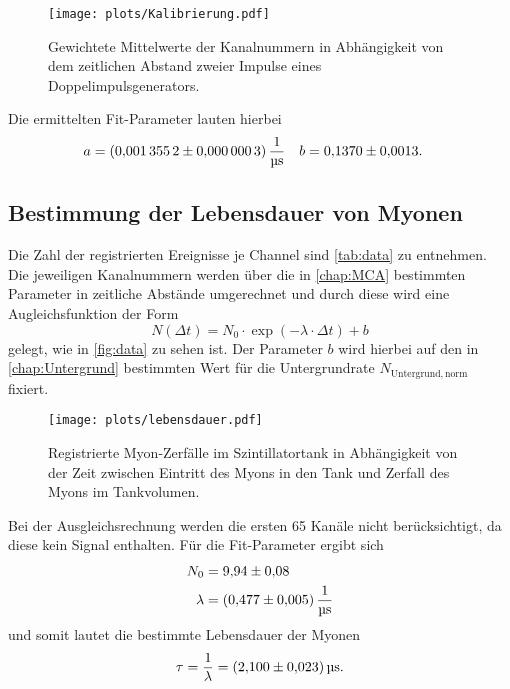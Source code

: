 \begin{figure}[H]
  \centering
  \texttt{[image: plots/Kalibrierung.pdf]}
  \caption{Gewichtete Mittelwerte der Kanalnummern in Abhängigkeit von dem zeitlichen Abstand zweier Impulse eines Doppelimpulsgenerators.}
  \label{fig:puls}
\end{figure}

Die ermittelten Fit-Parameter lauten hierbei
\begin{align*}
  a &= \SI{0.0013552 \pm 0.0000003}{\per\micro\second} & b &= \num{0.137 \pm 0.0013}.
\end{align*}

\subsection{Bestimmung der Lebensdauer von Myonen}


Die Zahl der registrierten Ereignisse je Channel sind \autoref{tab:data} zu entnehmen. Die jeweiligen Kanalnummern werden über die in \autoref{chap:MCA} bestimmten Parameter in zeitliche Abstände umgerechnet und durch diese wird eine Augleichsfunktion der Form
\begin{equation*}
  N(\Delta t) = N_0 \cdot \exp (- \lambda \cdot \Delta t) + b
\end{equation*}
gelegt, wie in \autoref{fig:data} zu sehen ist. Der Parameter $b$ wird hierbei auf den in \autoref{chap:Untergrund} bestimmten Wert für die Untergrundrate $N_\mathrm{Untergrund,norm}$ fixiert.
\begin{figure}[H]
  \centering
  \texttt{[image: plots/lebensdauer.pdf]}
  \caption{Registrierte Myon-Zerfälle im Szintillatortank in Abhängigkeit von der Zeit zwischen Eintritt des Myons in den Tank und Zerfall des Myons im Tankvolumen.}
  \label{fig:data}
\end{figure}
Bei der Ausgleichsrechnung werden die ersten 65 Kanäle nicht berücksichtigt, da diese kein Signal enthalten. Für die Fit-Parameter ergibt sich
\begin{align*}
  N_0 &= \num{9.94 \pm 0.08} \\
  \lambda &= \SI{0.477 \pm 0.005}{\per\micro\second}
\end{align*}
und somit lautet die bestimmte Lebensdauer der Myonen
\begin{equation*}
  \tau = \frac{1}{\lambda} = \SI{2.10 \pm 0.023}{\micro\second}.
\end{equation*}
